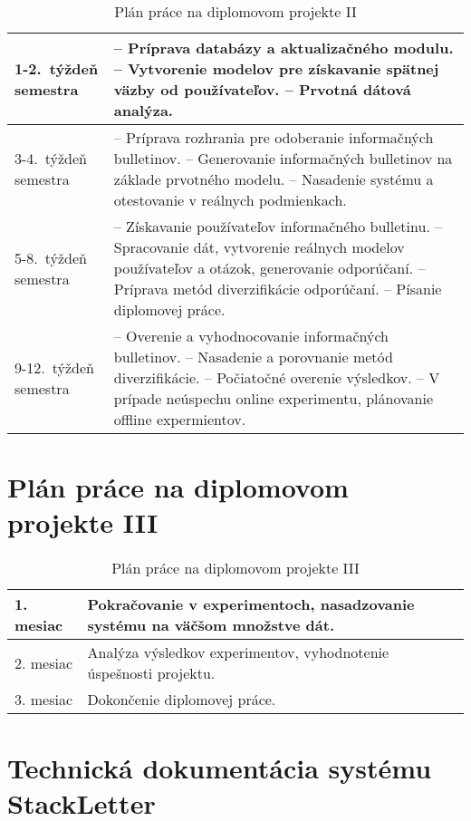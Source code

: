 \begin{table}[h]
\centering
\caption{Plán práce na diplomovom projekte II}
\begin{tabular}{|m{2.3cm}|m{12cm}|}
\hline
1-2.~týždeň semestra   & -- Príprava databázy a aktualizačného modulu.
				\newline -- Vytvorenie modelov pre získavanie spätnej väzby od používateľov.
				\newline -- Prvotná dátová analýza.
				\\ \hline
3-4.~týždeň semestra   & -- Príprava rozhrania pre odoberanie informačných bulletinov.
				\newline -- Generovanie informačných bulletinov na základe prvotného modelu.
				\newline -- Nasadenie systému a otestovanie v reálnych podmienkach.
				\\ \hline
5-8.~týždeň semestra   & -- Získavanie používateľov informačného bulletinu.
				\newline -- Spracovanie dát, vytvorenie reálnych modelov používateľov a otázok, generovanie odporúčaní.
				\newline -- Príprava metód diverzifikácie odporúčaní.
				\newline -- Písanie diplomovej práce.
				\\ \hline
9-12.~týždeň semestra  & -- Overenie a vyhodnocovanie informačných bulletinov.
				\newline -- Nasadenie a porovnanie metód diverzifikácie.
				\newline -- Počiatočné overenie výsledkov.
				\newline -- V prípade neúspechu online experimentu, plánovanie offline expermientov.
				\\ \hline
\end{tabular}
\end{table}

\section{Plán práce na diplomovom projekte III}

\begin{table}[h]
\centering
\caption{Plán práce na diplomovom projekte III}
\begin{tabular}{|m{2.3cm}|m{12cm}|}
\hline
1. mesiac & Pokračovanie v experimentoch, nasadzovanie systému na väčšom množstve dát. \\ \hline
2. mesiac & Analýza výsledkov experimentov, vyhodnotenie úspešnosti projektu. \\ \hline
3. mesiac & Dokončenie diplomovej práce.\\ \hline
\end{tabular}
\end{table}


\section{Technická dokumentácia systému StackLetter}\label{tech-doc}
